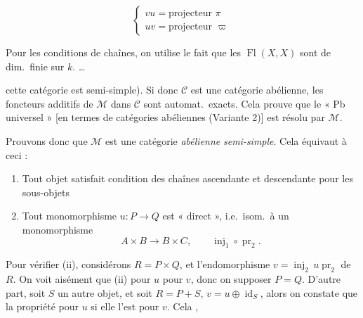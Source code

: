 \documentclass[11pt,a4paper]{article}
\begin{document}
\[
\left\{
\begin{array}{l}
  vu = \text{projecteur } \pi \\
  uv = \text{projecteur } \varpi
\end{array}
\right.
\]




Pour les conditions de chaînes, on utilise le fait que les
$\operatorname{Fl}(X,X)$ sont  de dim.\ finie sur $k$. …

cette catégorie est semi-simple). Si donc $\mathcal{C}$ est une catégorie
abélienne, les foncteurs additifs de $\mathcal{M}$ dans $\mathcal{C}$ sont
automat.\ exacts. Cela prouve que le « Pb universel »  [en termes de catégories abéliennes (Variante 2)] est résolu par
$\mathcal{M}$.

Prouvons donc que $\mathcal{M}$ est une catégorie \emph{abélienne}
\emph{semi-simple}. Cela équivaut à ceci :

\begin{enumerate}
  \item[(i)] Tout objet \struck{\ill{}} satisfait condition des chaînes
  ascendante et descendante pour les sous-objets
  \item[(ii)] Tout monomorphisme $u \colon P \to Q$ est « direct »,
  i.e.\ isom.\ à un monomorphisme 
  \[
    A \times B \longrightarrow B \times C, \qquad
    \operatorname{inj}_{1} \circ \operatorname{pr}_{2} .
  \]
\end{enumerate}

Pour vérifier (ii), \struck{\ill{}} considérons $R = P \times Q$,
et l'endomorphisme 
$v = \operatorname{inj}_{2}\, u \operatorname{pr}_{2}$ de $R$. On voit
aisément que \struck{\ill{}} (ii)  pour $u$
 \ill{} pour $v$, donc on
 supposer $P = Q$. D'autre part, soit $S$ un autre objet, et
soit $R = P + S$, $v = u \oplus \operatorname{id}_{S}$, alors on constate que
la propriété  pour $u$ si elle l'est pour $v$. Cela
\ill{},
\end{document}
